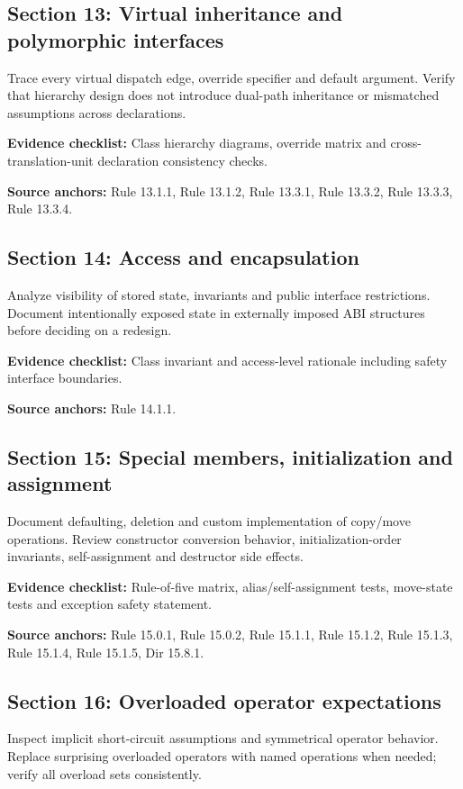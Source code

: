 \documentclass[10pt,letterpaper]{article}
\begin{document}
\subsection{Section 13: Virtual inheritance and polymorphic interfaces}
Trace every virtual dispatch edge, override specifier and default argument. Verify that hierarchy design does not introduce dual-path inheritance or mismatched assumptions across declarations.

\textbf{Evidence checklist:} Class hierarchy diagrams, override matrix and cross-translation-unit declaration consistency checks.

\textbf{Source anchors:} Rule 13.1.1, Rule 13.1.2, Rule 13.3.1, Rule 13.3.2, Rule 13.3.3, Rule 13.3.4.

\subsection{Section 14: Access and encapsulation}
Analyze visibility of stored state, invariants and public interface restrictions. Document intentionally exposed state in externally imposed ABI structures before deciding on a redesign.

\textbf{Evidence checklist:} Class invariant and access-level rationale including safety interface boundaries.

\textbf{Source anchors:} Rule 14.1.1.

\subsection{Section 15: Special members, initialization and assignment}
Document defaulting, deletion and custom implementation of copy/move operations. Review constructor conversion behavior, initialization-order invariants, self-assignment and destructor side effects.

\textbf{Evidence checklist:} Rule-of-five matrix, alias/self-assignment tests, move-state tests and exception safety statement.

\textbf{Source anchors:} Rule 15.0.1, Rule 15.0.2, Rule 15.1.1, Rule 15.1.2, Rule 15.1.3, Rule 15.1.4, Rule 15.1.5, Dir 15.8.1.

\subsection{Section 16: Overloaded operator expectations}
Inspect implicit short-circuit assumptions and symmetrical operator behavior. Replace surprising overloaded operators with named operations when needed; verify all overload sets consistently.
\end{document}
